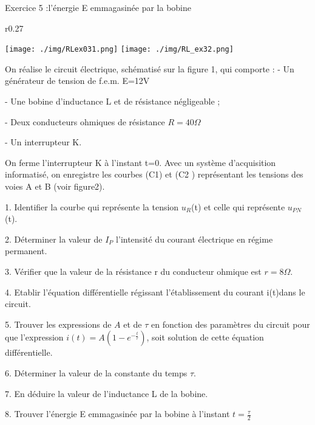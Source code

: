 \documentclass[12pt, french]{article}
\begin{document}
\vspace{-0.7cm}

\begin{Box2}{Exercice 5 :l’énergie E emmagasinée par la bobine }
	\begin{wrapfigure}[15]{r}{0.27\textwidth}
  \begin{center}
	\texttt{[image: ./img/RLex031.png]}
	\texttt{[image: ./img/RL\_ex32.png]}
  \end{center}
\end{wrapfigure}


On réalise le circuit électrique, schématisé sur la figure 1, qui comporte : 
- Un générateur de tension de f.e.m. E=12V

- Une bobine d’inductance L et de résistance négligeable ;

- Deux conducteurs ohmiques de résistance $R = 40\Omega$

- Un interrupteur K.

On ferme l’interrupteur K à l’instant t=0. Avec un système d’acquisition informatisé, on enregistre les
courbes (C1) et (C2 ) représentant les tensions des voies A et B (voir figure2).

1. Identifier la courbe qui représente la tension $u_R$(t) et celle qui représente $u_{PN}$(t).

2. Déterminer la valeur de $I_P$ l’intensité du courant électrique en régime
permanent.

3. Vérifier que la valeur de la résistance r
du conducteur ohmique est $r=8\Omega$.

4. Etablir l’équation différentielle
régissant l’établissement du courant
i(t)dans le circuit.

5. Trouver les expressions de $A$ et de $\tau$ en
fonction des paramètres du circuit pour
que l’expression $i(t) =A(1- e^{-\frac{t}{\tau}})$, soit solution de
cette équation différentielle.

6. Déterminer la valeur de la constante du temps $\tau$.

7. En déduire la valeur de l’inductance L de la bobine.

8. Trouver l’énergie E emmagasinée par la bobine à l’instant $t = \frac{\tau}{2}$

\end{Box2}


\end{document}
